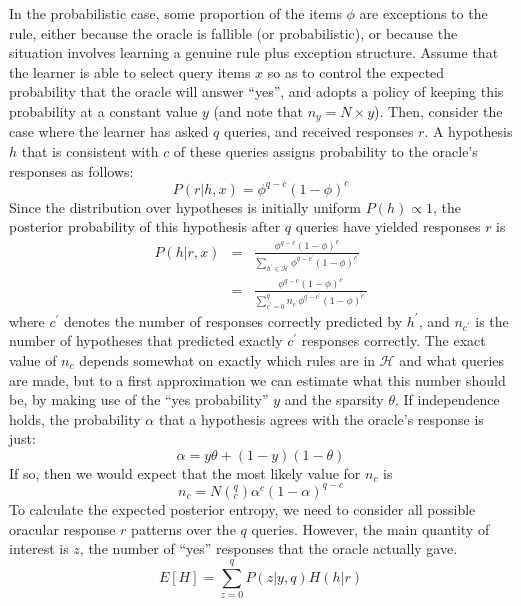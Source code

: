 \documentclass{apa}
\begin{document}
In the probabilistic case, some proportion of the items $\phi$ are exceptions to the rule, either because the oracle is fallible (or probabilistic), or because the situation involves learning a genuine rule plus exception structure. Assume that the learner is able to select query items $x$ so as to control the expected probability that the oracle will answer ``yes'', and adopts a policy of keeping this probability at a constant value $y$ (and note that $n_y = N \times y$). Then, consider the case where the learner has asked $q$ queries, and received responses $r$. A hypothesis $h$ that is consistent with $c$ of these queries assigns probability to the oracle's responses as follows:
\begin{equation}
P(r|h,x) = \phi^{q-c} (1-\phi)^c
\end{equation}
Since the distribution over hypotheses is initially uniform $P(h) \propto 1$, the posterior probability of this hypothesis after $q$ queries have yielded responses $r$ is
\begin{eqnarray}
P(h|r,x) &=& \frac{\phi^{q-c} (1-\phi)^c}{\sum_{h^\prime \in \mathcal{H}} \phi^{q-c^\prime} (1-\phi)^{c^\prime}} \\
&=& \frac{\phi^{q-c} (1-\phi)^c}{\sum_{c^\prime =0}^{q} n_{c^\prime} \phi^{q-c^\prime} (1-\phi)^{c^\prime}}
\end{eqnarray}
where $c^\prime$ denotes the number of responses correctly predicted by $h^\prime$, and $n_{c^\prime}$ is the number of hypotheses that predicted exactly $c^\prime$ responses correctly. The exact value of $n_c$ depends somewhat on exactly which rules are in $\mathcal{H}$ and what queries are made, but to a first approximation we can estimate what this number should be, by making use of the ``yes probability'' $y$ and the sparsity $\theta$. If independence holds, the probability $\alpha$ that a hypothesis agrees with the oracle's response is just:
\begin{equation}
\alpha = y\theta + (1-y)(1-\theta)
\end{equation}
If so, then we would expect that the most likely value for $n_c$ is
\begin{equation}
n_c = N (^q_c) \alpha^c (1-\alpha)^{q-c}
\end{equation}
To calculate the expected posterior entropy, we need to consider all possible oracular response $r$ patterns over the $q$ queries. However, the main quantity of interest is $z$, the number of ``yes'' responses that the oracle actually gave.
\begin{equation}
E[H] = \sum_{z=0}^q P(z|y,q) H(h|r)
\end{equation}
\end{document}
